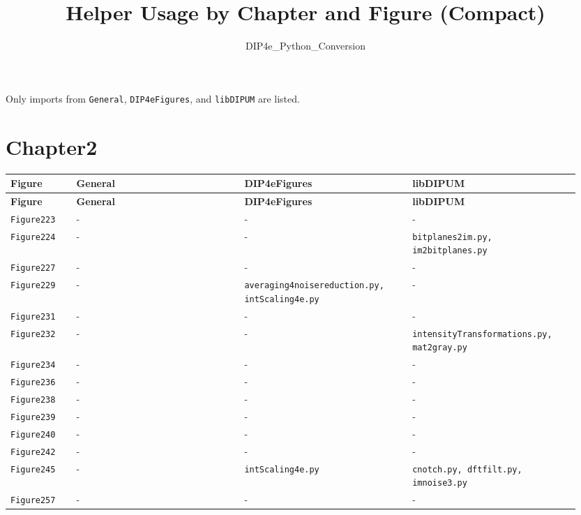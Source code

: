 \documentclass[10pt]{article}
\title{Helper Usage by Chapter and Figure (Compact)}
\author{DIP4e\_Python\_Conversion}
\date{}
\begin{document}
\maketitle
\small
Only imports from \texttt{General}, \texttt{DIP4eFigures}, and \texttt{libDIPUM} are listed.
\section*{Chapter2}
\setlength{\tabcolsep}{4pt}
\begin{longtable}{p{0.11\linewidth} p{0.28\linewidth} p{0.28\linewidth} p{0.28\linewidth}}
\toprule
\textbf{Figure} & \textbf{General} & \textbf{DIP4eFigures} & \textbf{libDIPUM} \\
\midrule
\endfirsthead
\toprule
\textbf{Figure} & \textbf{General} & \textbf{DIP4eFigures} & \textbf{libDIPUM} \\
\midrule
\endhead
\bottomrule
\endfoot
\texttt{Figure223} & - & - & - \\
\texttt{Figure224} & - & - & \texttt{bitplanes2im.py, im2bitplanes.py} \\
\texttt{Figure227} & - & - & - \\
\texttt{Figure229} & - & \texttt{averaging4noisereduction.py, intScaling4e.py} & - \\
\texttt{Figure231} & - & - & - \\
\texttt{Figure232} & - & - & \texttt{intensityTransformations.py, mat2gray.py} \\
\texttt{Figure234} & - & - & - \\
\texttt{Figure236} & - & - & - \\
\texttt{Figure238} & - & - & - \\
\texttt{Figure239} & - & - & - \\
\texttt{Figure240} & - & - & - \\
\texttt{Figure242} & - & - & - \\
\texttt{Figure245} & - & \texttt{intScaling4e.py} & \texttt{cnotch.py, dftfilt.py, imnoise3.py} \\
\texttt{Figure257} & - & - & - \\
\end{longtable}
\end{document}
